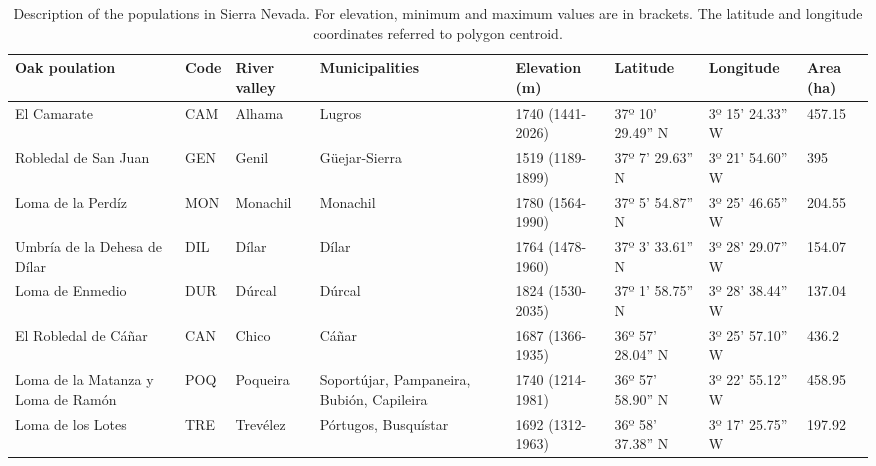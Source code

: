 \begin{table} 
\caption{Description of the \Qp populations in Sierra Nevada. For elevation, minimum and maximum values are in brackets. The latitude and longitude coordinates referred to polygon centroid.}\label{tab:tpop}
\begin{adjustbox}{width=\linewidth}
	\begin{threeparttable}
		\begin{tabular}{@{}llllllll@{}}
			\toprule
			Oak poulation & Code & River valley & Municipalities & Elevation (m) & Latitude & Longitude & Area (ha) \\ \midrule
			El Camarate & CAM & Alhama & Lugros & 1740  (1441-2026) & 37º 10' 29.49'' N & 3º 15' 24.33'' W & 457.15 \\
			Robledal de San Juan & GEN & Genil & Güejar-Sierra & 1519  (1189-1899) & 37º 7' 29.63'' N & 3º 21' 54.60'' W & 395 \\
			Loma de la Perdíz & MON & Monachil & Monachil & 1780  (1564-1990) & 37º 5' 54.87'' N & 3º 25' 46.65'' W & 204.55 \\
			Umbría de la Dehesa de Dílar & DIL & Dílar & Dílar & 1764  (1478-1960) & 37º 3' 33.61'' N & 3º 28' 29.07'' W & 154.07 \\
			Loma de Enmedio & DUR & Dúrcal & Dúrcal & 1824  (1530-2035) & 37º 1' 58.75'' N & 3º 28' 38.44'' W & 137.04 \\
			El Robledal de Cáñar & CAN & Chico & Cáñar & 1687  (1366-1935) & 36º 57' 28.04'' N & 3º 25' 57.10'' W & 436.2 \\
			Loma de la Matanza y Loma de Ramón & POQ & Poqueira & Soportújar, Pampaneira, Bubión, Capileira & 1740  (1214-1981) & 36º 57' 58.90'' N & 3º 22' 55.12'' W & 458.95 \\
			Loma de los Lotes & TRE & Trevélez & Pórtugos, Busquístar & 1692  (1312-1963) & 36º 58' 37.38'' N & 3º 17' 25.75'' W & 197.92 \\ \bottomrule
		\end{tabular}
	\end{threeparttable}
\end{adjustbox}
\end{table}

